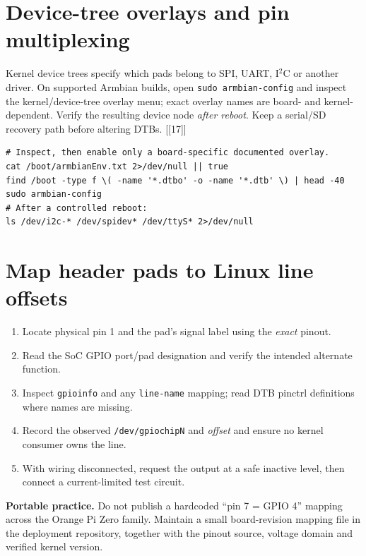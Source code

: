 \documentclass[10pt,oneside,openany]{report}
\newcommand{\code}[1]{\texttt{#1}}
\newcommand{\smallref}[1]{{\sffamily\scriptsize\color{slate}[#1]}}
\begin{document}
\section{Device-tree overlays and pin multiplexing}
Kernel device trees specify which pads belong to SPI, UART, I\(^{2}\)C or another driver. On supported Armbian builds, open \code{sudo armbian-config} and inspect the kernel/device-tree overlay menu; exact overlay names are board- and kernel-dependent. Verify the resulting device node \emph{after reboot}. Keep a serial/SD recovery path before altering DTBs. \smallref{[17]}
\begin{lstlisting}[style=sh]
# Inspect, then enable only a board-specific documented overlay.
cat /boot/armbianEnv.txt 2>/dev/null || true
find /boot -type f \( -name '*.dtbo' -o -name '*.dtb' \) | head -40
sudo armbian-config
# After a controlled reboot:
ls /dev/i2c-* /dev/spidev* /dev/ttyS* 2>/dev/null
\end{lstlisting}
\section{Map header pads to Linux line offsets}
\begin{enumerate}
\item Locate physical pin 1 and the pad's signal label using the \emph{exact} pinout.
\item Read the SoC GPIO port/pad designation and verify the intended alternate function.
\item Inspect \code{gpioinfo} and any \code{line-name} mapping; read DTB pinctrl definitions where names are missing.
\item Record the observed \code{/dev/gpiochipN} and \emph{offset} and ensure no kernel consumer owns the line.
\item With wiring disconnected, request the output at a safe inactive level, then connect a current-limited test circuit.
\end{enumerate}
\begin{fieldnote}
\textbf{Portable practice.} Do not publish a hardcoded ``pin 7 = GPIO 4'' mapping across the Orange Pi Zero family. Maintain a small board-revision mapping file in the deployment repository, together with the pinout source, voltage domain and verified kernel version.
\end{fieldnote}
\end{document}
